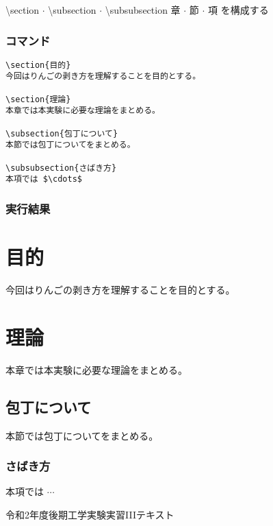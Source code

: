 \documentclass[a4j, titlepage]{jarticle}
\begin{document}
\begin{itembox}[l]{\textbackslash section $\cdot$ \textbackslash subsection $\cdot$ \textbackslash subsubsection}
章 $\cdot$ 節 $\cdot$ 項 を構成する
\begin{multicols}{2}

\subsubsection*{コマンド}

\begin{lstlisting}
\section{目的}
今回はりんごの剥き方を理解することを目的とする。

\section{理論}
本章では本実験に必要な理論をまとめる。

\subsection{包丁について}
本節では包丁についてをまとめる。

\subsubsection{さばき方}
本項では $\cdots$
\end{lstlisting}

\newpage
\subsubsection*{実行結果}
\setcounter{section}{0}
\begin{screen}

    \section{目的}
    今回はりんごの剥き方を理解することを目的とする。

    \section{理論}
    本章では本実験に必要な理論をまとめる。

    \subsection{包丁について}
    本節では包丁についてをまとめる。

    \subsubsection{さばき方}
    本項では $\cdots$

\end{screen}


\end{multicols}

\end{itembox}



\begin{thebibliography}{9}
     令和2年度後期工学実験実習IIIテキスト
\end{thebibliography}
\end{document}
